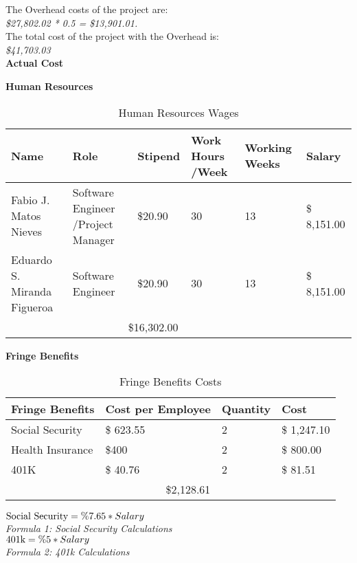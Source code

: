 The Overhead costs of the project are:\\
\textit{\$27,802.02 * 0.5 = \$13,901.01.}\\
The total cost of the project with the Overhead is:\\
\textit{\$41,703.03}\\
\textbf{Actual Cost}
\begin{table}[H]
   \centering
   \textbf{Human Resources}
   \begin{tabular}{||m{}|m{}|m{}|m{}|m{}|m{}||}
    \hline 
    \rowcolor{cyan!50}
    Name & Role & Stipend & Work Hours /Week & Working Weeks & Salary\\
    \hline
    Fabio J. Matos Nieves & Software Engineer /Project Manager& \$20.90 & 30 & 13 & \$ 8,151.00\\ 
    \hline
    Eduardo S. Miranda Figueroa & Software Engineer & \$20.90 & 30 & 13 & \$ 8,151.00\\
   
    \hline 
    \rowcolor{teal!50}
    \multicolumn{3}{||c|}{Total Cost} & \multicolumn{3}{c||}{\$16,302.00}\\
    \hline
   \end{tabular}
   \caption {Human Resources Wages}
   \label{table:7}
\end{table}
\begin{table}[H]
   \centering
   \textbf{Fringe Benefits\cite{WhatAreFringe}}
   \begin{tabular}{||m{}|m{}|m{}|m{}||}
       \hline 
       \rowcolor{cyan!50}
       Fringe Benefits & Cost per Employee & Quantity & Cost\\
       \hline
       Social Security &  \$ 623.55 & 2 & \$ 1,247.10\\ 
       \hline
       Health Insurance & \$400 & 2 & \$ 800.00 \\
       \hline
       401K & \$ 40.76 & 2 & \$ 81.51\\ 
       \hline 
       \rowcolor{teal!50}
       \multicolumn{2}{||c|}{Total Cost} & \multicolumn{2}{c||}{\$2,128.61}\\
       \hline
      \end{tabular}
      \caption {Fringe Benefits Costs}
      \label{table:8}
      $\textnormal{Social Security} = \%7.65 * Salary$\\
     \textit{Formula 1: Social Security Calculations}\\
       $\textnormal{401k} = \%5 * Salary$\\
       \textit{Formula 2: 401k Calculations}
      
\end{table}
